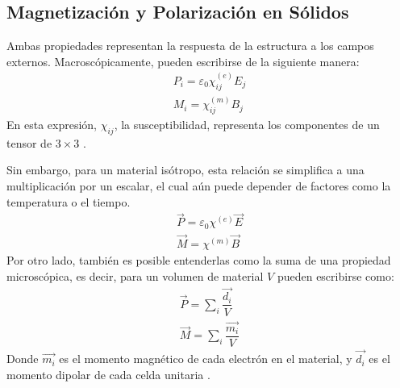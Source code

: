 \documentclass[../main.tex]{subfiles}
\begin{document}
\subsection{Magnetización y Polarización en Sólidos}
Ambas propiedades representan la respuesta de la estructura a los campos externos. Macroscópicamente, pueden escribirse de la siguiente manera:
\begin{equation}
    \begin{split}
        P_{i}=\varepsilon_0\chi_{ij}^{(e)}E_j\\
        M_{i}=\chi_{ij}^{(m)}B_j
    \end{split}
    \label{eq:tensorMP}
\end{equation}
En esta expresión, $\chi_{ij}$, la susceptibilidad, representa los componentes de un tensor de $3\times3$ \cite{Damjanovic2006}.

Sin embargo, para un material isótropo, esta relación se simplifica a una multiplicación por un escalar, el cual aún puede depender de factores como la temperatura o el tiempo.
\begin{equation}
    \begin{split}
        \vec{P}=\varepsilon_0\chi^{(e)}\vec{E}\\
        \vec{M}=\chi^{(m)}\vec{B}
    \end{split}
    \label{eq:escalarMP}
\end{equation}
Por otro lado, también es posible entenderlas como la suma de una propiedad microscópica, es decir, para un volumen de material $V$ pueden escribirse como:
\begin{equation}
    \begin{split}
        \vec{P}=\sum_i \dfrac{\vec{d_i}}{V}\\
        \vec{M}=\sum_i \dfrac{\vec{m_i}}{V}
    \end{split}
    \label{eq:relacionmicromacro}
\end{equation}
Donde $\vec{m_i}$ es el momento magnético de cada electrón en el material, y $\vec{d_i}$ es el momento dipolar de cada celda unitaria \cite{Visintin2006}.
\end{document}
